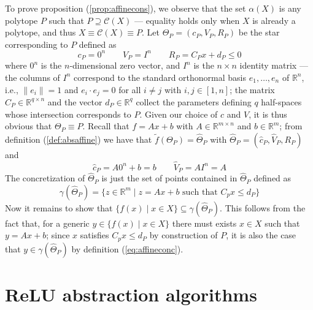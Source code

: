 To prove proposition (\ref{prop:affinecons}), we observe that
the set $\alpha(X)$ is any polytope $P$ such that $P \supseteq \mathcal{C}(X)$
--- equality holds only when $X$ is already a polytope, and thus $X
\equiv \mathcal{C}(X) \equiv P$. Let $\Theta_P = (c_P,V_P,R_P)$ be the
star corresponding to $P$ defined as
\begin{equation*}
c_P = 0^n \qquad V_P = I^n \qquad R_P = C_Px + d_P \leq 0
\end{equation*}
where $0^n$ is the $n$-dimensional zero vector, and $I^n$ is the $n
\times n$ identity matrix --- the columns of $I^n$ correspond
to the standard orthonormal basis $e_1, \ldots, e_n$ of
$\mathbb{R}^n$, i.e., $\lVert e_i \rVert = 1$ and $e_i \cdot e_j = 0$
for all $i \neq j$ with $i,j \in [1,n]$; the matrix $C_P \in
\mathbb{R}^{q \times n}$ and the vector $d_P \in 
\mathbb{R}^q$ collect the parameters defining $q$ half-spaces
whose intersection corresponds to $P$. Given our choice of $c$ and
$V$, it is thus obvious that $\Theta_P \equiv P$. Recall that $f = Ax + b$
with $A \in \mathbb{R}^{m \times n}$ and $b \in \mathbb{R}^m$; from  
definition (\ref{def:absaffine}) we have that
$\tilde{f}(\Theta_P) = \hat{\Theta}_P$ with $\hat{\Theta}_P = (\hat{c}_P, \hat{V}_P, R_P)$ and
\begin{equation*}
\hat{c}_P = A 0^n + b = b \qquad \hat{V}_P = AI^n = A
\end{equation*}
The concretization of $\hat{\Theta}_P$ is just the set of
points contained in $\hat{\Theta}_P$ defined as
\begin{equation}
  \label{eq:affineconc}
\gamma(\hat{\Theta}_P) = \{ z \in \mathbb{R}^m \mid z = Ax  + b
\mbox{ such that } C_px \leq d_P \}
\end{equation}
Now it remains to show that $\{ f(x) \mid x \in X \} \subseteq
\gamma(\hat{\Theta}_P)$. This follows from the fact that, for a generic $y
\in \{ f(x) \mid x \in X \}$ there must exists $x \in X$ such that $y
= Ax + b$; since $x$ satisfies $C_p x \leq d_P$ by construction of
$P$, it is also the case that $y \in \gamma(\hat{\Theta}_P)$ by definition
(\ref{eq:affineconc}).

\section{ReLU abstraction algorithms}
\label{sec:relu_abst}

